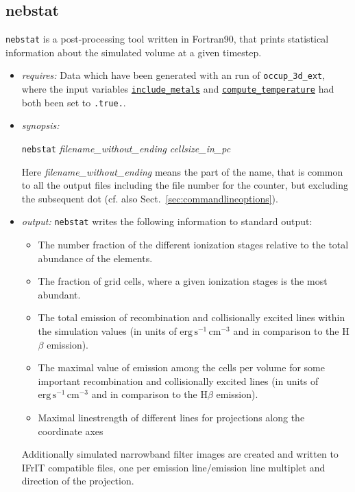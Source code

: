 \documentclass[a4paper,10pt]{article}
\begin{document}
\subsection{nebstat}
\label{util:nebstat}
\texttt{nebstat} is a post-processing tool written in Fortran90, that prints  
statistical information about the simulated volume at a given timestep.
\begin{itemize}
 \item \textit{requires:} Data which have been generated with an run of 
  \texttt{occup\_3d\_ext}, where the input variables  
  \texttt{\hyperref[opt:includemetals]{include\_metals}} and 
  \texttt{\hyperref[opt:computetemperature]{compute\_temperature}} had both 
  been set to \texttt{.true.}.
 \item \textit{synopsis:}
 \begin{center}
 \texttt{nebstat} \textit{filename\_without\_ending} \textit{cellsize\_in\_pc}
 \end{center}
 Here \textit{filename\_without\_ending} means the part of the name, that is  
 common to all the output files including the file number for the counter, but 
 excluding the subsequent dot (cf. also Sect.~\ref{sec:commandlineoptions}).

 \item \textit{output:} \texttt{nebstat} writes the following information to 
  standard output:
  \begin{itemize}
   \item The number fraction of the different ionization stages relative to the 
    total abundance of the elements.
   \item The fraction of grid cells, where a given ionization stages is the 
    most abundant.
   \item The total emission of recombination and collisionally excited lines 
    within the simulation values (in units of 
    $\mathrm{erg\, s^{-1}\,cm^{-3}}$ and in comparison to the H$\beta$ 
    emission).
   \item The maximal value of emission among the cells  per volume for some  
    important recombination and collisionally excited lines (in units of 
    $\mathrm{erg\, s^{-1}\, cm^{-3}}$ and in comparison to the H$\beta$ 
    emission).
   \item Maximal linestrength of different lines for projections along the 
    coordinate axes
 \end{itemize}

 Additionally simulated narrowband filter images are created and written to  
 IFrIT compatible files, one per emission line/emission line multiplet and 
 direction of the projection. 
 \end{itemize} 
\end{document}
